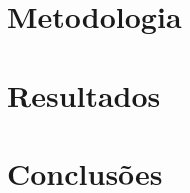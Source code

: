 \documentclass[
	11pt,				%
	openright,			%
	twoside,			%
	a4paper,			%
	english,			%
	french,				%
	spanish,			%
	brazil				%
	]{abntex2}          %
\begin{document}


\chapter[Metodologia]{Metodologia}\label{chap:metodologia}



\chapter[Resultados]{Resultados}\label{chap:resultados}




\chapter[Conclusões]{Conclusões}\label{chap:Conclusões}



\postextual
%
\begin{small}

\end{small}
%
%
%
\end{document}
